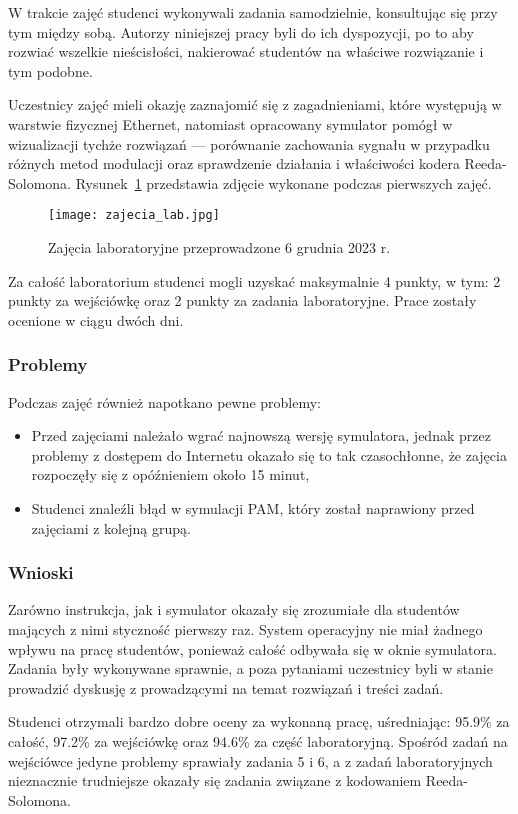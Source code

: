 W trakcie zajęć studenci wykonywali zadania samodzielnie, konsultując się przy tym między sobą. Autorzy niniejszej pracy
byli do ich dyspozycji, po to aby rozwiać wszelkie nieścisłości, nakierować studentów na właściwe rozwiązanie i tym podobne.

Uczestnicy zajęć mieli okazję zaznajomić się z zagadnieniami, które występują w warstwie fizycznej Ethernet, natomiast
opracowany symulator pomógł w wizualizacji tychże rozwiązań --- porównanie zachowania sygnału w przypadku różnych metod modulacji oraz
sprawdzenie działania i właściwości kodera Reeda-Solomona. Rysunek~\ref{fig:zajecia_lab_zdjecie} przedstawia zdjęcie wykonane podczas pierwszych zajęć.

\begin{figure}[H]
    \centering
    \texttt{[image: zajecia\_lab.jpg]}
    \caption{Zajęcia laboratoryjne przeprowadzone 6 grudnia 2023 r.}
    \label{fig:zajecia_lab_zdjecie}
\end{figure}

Za całość laboratorium studenci mogli uzyskać maksymalnie 4 punkty, w tym: 2 punkty za wejściówkę oraz 2 punkty za zadania laboratoryjne. Prace zostały ocenione w ciągu dwóch dni.

\subsubsection{Problemy}
Podczas zajęć również napotkano pewne problemy:
\begin{itemize}
    \item Przed zajęciami należało wgrać najnowszą wersję symulatora, jednak przez problemy z dostępem do Internetu okazało się to tak czasochłonne, że zajęcia rozpoczęły się z opóźnieniem około 15 minut,
    \item Studenci znaleźli błąd w symulacji PAM, który został naprawiony przed zajęciami z kolejną grupą.
\end{itemize}

\subsubsection{Wnioski}
Zarówno instrukcja, jak i symulator okazały się zrozumiałe dla studentów mających z nimi styczność pierwszy raz. System operacyjny nie miał żadnego wpływu na pracę studentów, ponieważ całość odbywała się w oknie symulatora. Zadania były wykonywane sprawnie, a poza pytaniami uczestnicy byli w stanie prowadzić dyskusję z prowadzącymi na temat rozwiązań i treści zadań.

Studenci otrzymali bardzo dobre oceny za wykonaną pracę, uśredniając: 95.9\% za całość, 97.2\% za wejściówkę oraz 94.6\% za część laboratoryjną. Spośród zadań na wejściówce jedyne problemy sprawiały zadania 5 i 6, a z zadań laboratoryjnych nieznacznie trudniejsze okazały się zadania związane z kodowaniem Reeda-Solomona.
